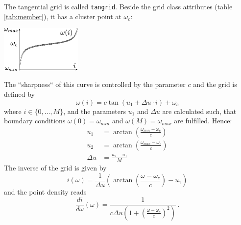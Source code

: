 The tangential grid is called \texttt{tangrid}. Beside the grid class attributes (table \ref{tab:member}), it has a cluster point at $\omega_c$: \\

\begin{center}
	\includegraphics[width=0.3\textwidth]{pics/tangrid.eps}
\end{center}

\noindent The ``sharpness`` of this curve is controlled by the parameter $c$ and the grid is defined by
\[
	\omega(i)= c \tan (u_1+\Delta u \cdot i) + \omega_c
\]
where $i\in \{0,\dots,M\}$, and the parameters $u_1$ and $\Delta u$ are calculated such, that boundary conditions $\omega(0)=\omega_{min}$ and $\omega(M)=\omega_{max}$ are fulfilled. Hence:
\begin{align*}
	u_1&=\arctan\left(\frac{\omega_{min}-\omega_c}{c}\right)\\
	u_2&=\arctan\left(\frac{\omega_{max}-\omega_c}{c}\right)\\
	\Delta u&=\frac{u_2-u_1}{M}
\end{align*}
The inverse of the grid is given by
\[
	i(\omega)=\frac{1}{\Delta u}\left(\arctan\left(\frac{\omega-\omega_c}{c}\right)-u_1\right)
\]
and the point density reads
\begin{equation}\label{eqn:tangrid_grid_point_density}
 \frac{di}{d\omega} (\omega) = \frac{1}{c \Delta u\left(1+\left(\frac{\omega-\omega_c}{c}\right)^2\right)}\,.
\end{equation}

